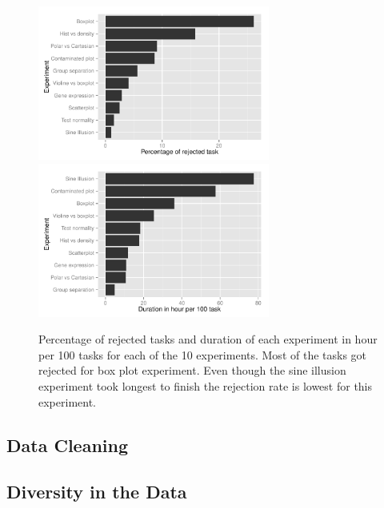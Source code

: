 \documentclass[11pt]{article}
\begin{document}
\begin{figure}[htbp] 
   \centering
   \includegraphics[width=3in]{rejected_task.pdf}
      \includegraphics[width=3in]{task_duration.pdf} 
   \caption{Percentage of rejected tasks and duration of each experiment in hour per 100 tasks for each of the 10 experiments. Most of the tasks got rejected for box plot experiment.  Even though the sine illusion experiment took longest to finish the rejection rate is lowest for this experiment.}
   \label{fig:task_duration}
\end{figure}


\subsection{Data Cleaning}

\subsection{Diversity in the Data}
\end{document}
